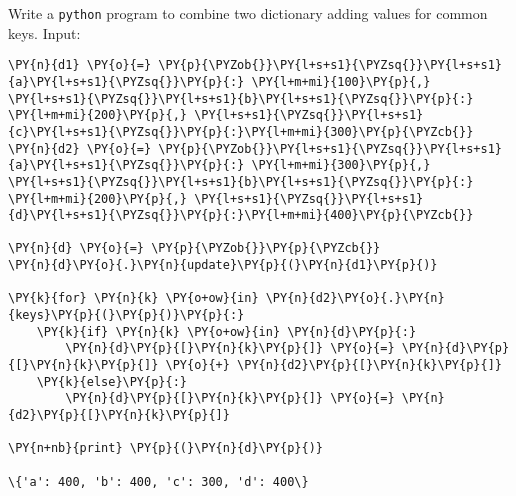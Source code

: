 \begin{Exercise}
Write a \texttt{python} program to combine two dictionary adding values for common keys.
Input:
\begin{Shaded}
\begin{Highlighting}[]
\OperatorTok{=}\NormalTok{ \{}\NormalTok{: }\NormalTok{, }\NormalTok{: }\NormalTok{, }\NormalTok{:}\NormalTok{\}}
\OperatorTok{=}\NormalTok{ \{}\NormalTok{: }\NormalTok{, }\NormalTok{: }\NormalTok{, }\NormalTok{:}\NormalTok{\}}
\end{Highlighting}
\end{Shaded}
\end{Exercise}

\begin{Answer}
\begin{tcolorbox}[size=fbox, boxrule=1pt, colback=cellbackground, colframe=cellborder]
\begin{Verbatim}[commandchars=\\\{\}]
\PY{n}{d1} \PY{o}{=} \PY{p}{\PYZob{}}\PY{l+s+s1}{\PYZsq{}}\PY{l+s+s1}{a}\PY{l+s+s1}{\PYZsq{}}\PY{p}{:} \PY{l+m+mi}{100}\PY{p}{,} \PY{l+s+s1}{\PYZsq{}}\PY{l+s+s1}{b}\PY{l+s+s1}{\PYZsq{}}\PY{p}{:} \PY{l+m+mi}{200}\PY{p}{,} \PY{l+s+s1}{\PYZsq{}}\PY{l+s+s1}{c}\PY{l+s+s1}{\PYZsq{}}\PY{p}{:}\PY{l+m+mi}{300}\PY{p}{\PYZcb{}}
\PY{n}{d2} \PY{o}{=} \PY{p}{\PYZob{}}\PY{l+s+s1}{\PYZsq{}}\PY{l+s+s1}{a}\PY{l+s+s1}{\PYZsq{}}\PY{p}{:} \PY{l+m+mi}{300}\PY{p}{,} \PY{l+s+s1}{\PYZsq{}}\PY{l+s+s1}{b}\PY{l+s+s1}{\PYZsq{}}\PY{p}{:} \PY{l+m+mi}{200}\PY{p}{,} \PY{l+s+s1}{\PYZsq{}}\PY{l+s+s1}{d}\PY{l+s+s1}{\PYZsq{}}\PY{p}{:}\PY{l+m+mi}{400}\PY{p}{\PYZcb{}}

\PY{n}{d} \PY{o}{=} \PY{p}{\PYZob{}}\PY{p}{\PYZcb{}}
\PY{n}{d}\PY{o}{.}\PY{n}{update}\PY{p}{(}\PY{n}{d1}\PY{p}{)}

\PY{k}{for} \PY{n}{k} \PY{o+ow}{in} \PY{n}{d2}\PY{o}{.}\PY{n}{keys}\PY{p}{(}\PY{p}{)}\PY{p}{:}
    \PY{k}{if} \PY{n}{k} \PY{o+ow}{in} \PY{n}{d}\PY{p}{:}
        \PY{n}{d}\PY{p}{[}\PY{n}{k}\PY{p}{]} \PY{o}{=} \PY{n}{d}\PY{p}{[}\PY{n}{k}\PY{p}{]} \PY{o}{+} \PY{n}{d2}\PY{p}{[}\PY{n}{k}\PY{p}{]}
    \PY{k}{else}\PY{p}{:}
        \PY{n}{d}\PY{p}{[}\PY{n}{k}\PY{p}{]} \PY{o}{=} \PY{n}{d2}\PY{p}{[}\PY{n}{k}\PY{p}{]}

\PY{n+nb}{print} \PY{p}{(}\PY{n}{d}\PY{p}{)}

\{'a': 400, 'b': 400, 'c': 300, 'd': 400\}
\end{Verbatim}
\end{tcolorbox}
\end{Answer}

